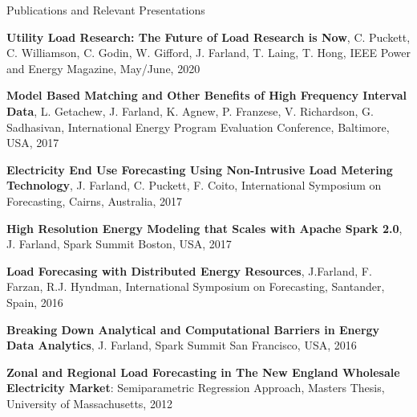 \documentclass{resume} %
\begin{document}
\begin{rSection}{Publications and Relevant Presentations}

\item {\bf Utility Load Research: The Future of Load Research is Now}, C. Puckett, C. Williamson, C. Godin, W. Gifford, J. Farland, T. Laing, T. Hong, IEEE Power and Energy Magazine, May/June, 2020

\item {\bf Model Based Matching and Other Benefits of High Frequency Interval Data}, L. Getachew, J. Farland, K. Agnew, P. Franzese, V. Richardson, G. Sadhasivan, International Energy Program Evaluation Conference, Baltimore, USA, 2017

\item {\bf Electricity End Use Forecasting Using Non-Intrusive Load Metering Technology}, J. Farland, C. Puckett, F. Coito, International Symposium on Forecasting, Cairns, Australia, 2017

\item {\bf High Resolution Energy Modeling that Scales with Apache Spark 2.0}, J. Farland, Spark Summit Boston, USA, 2017

\item {\bf Load Forecasing with Distributed Energy Resources}, J.Farland, F. Farzan, R.J. Hyndman, International Symposium on Forecasting, Santander, Spain, 2016

\item {\bf Breaking Down Analytical and Computational Barriers in Energy Data Analytics}, J. Farland, Spark Summit San Francisco, USA, 2016

\item {\bf  Zonal and Regional Load Forecasting in The New England Wholesale Electricity Market}: Semiparametric Regression Approach, Masters Thesis, University of Massachusetts, 2012

\end{rSection}

\end{document}
